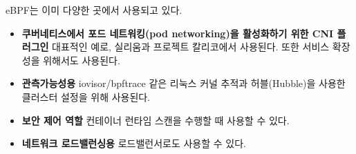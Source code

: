 \begin{flushleft}
    eBPF는 이미 다양한 곳에서 사용되고 있다.
\end{flushleft}

\begin{itemize}
    \item \textbf{쿠버네티스에서 포드 네트워킹(pod networking)을 활성화하기 위한 CNI 플러그인}\newline
        대표적인 예로, 실리움과 프로젝트 칼리코에서 사용된다.
        또한 서비스 확장성을 위해서도 사용된다.
    \item \textbf{관측가능성용}\newline
        iovisor/bpftrace 같은 리눅스 커널 추적과
        허블(Hubble)을 사용한 클러스터 설정을 위해 사용된다.
    \item \textbf{보안 제어 역할}\newline
        컨테이너 런타임 스캔을 수행할 때 사용할 수 있다.
    \item \textbf{네트워크 로드밸런싱용}\newline
        로드밸런서로도 사용할 수 있다.
\end{itemize}
